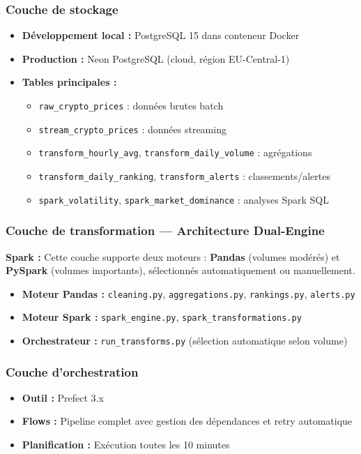 \documentclass[12pt,a4paper]{article}
\newcommand{\sparkbox}[1]{%
  \vspace{4pt}
  \noindent\colorbox{orange!15}{\parbox{\dimexpr\linewidth-2\fboxsep}{%
    {\color{sparkcolor}\textbf{Spark :}} #1
  }}
  \vspace{4pt}
}
\begin{document}
\subsubsection{Couche de stockage}
\begin{itemize}
    \item \textbf{Développement local :} PostgreSQL 15 dans conteneur Docker
    \item \textbf{Production :} Neon PostgreSQL (cloud, région EU-Central-1)
    \item \textbf{Tables principales :}
    \begin{itemize}[noitemsep]
        \item \texttt{raw\_crypto\_prices} : données brutes batch
        \item \texttt{stream\_crypto\_prices} : données streaming
        \item \texttt{transform\_hourly\_avg}, \texttt{transform\_daily\_volume} : agrégations
        \item \texttt{transform\_daily\_ranking}, \texttt{transform\_alerts} : classements/alertes
        \item \texttt{spark\_volatility}, \texttt{spark\_market\_dominance} : analyses Spark SQL
    \end{itemize}
\end{itemize}

\subsubsection{Couche de transformation --- Architecture Dual-Engine}

\sparkbox{Cette couche supporte deux moteurs : \textbf{Pandas} (volumes modérés) et \textbf{PySpark} (volumes importants), sélectionnés automatiquement ou manuellement.}

\begin{itemize}
    \item \textbf{Moteur Pandas :} \texttt{cleaning.py}, \texttt{aggregations.py}, \texttt{rankings.py}, \texttt{alerts.py}
    \item \textbf{Moteur Spark :} \texttt{spark\_engine.py}, \texttt{spark\_transformations.py}
    \item \textbf{Orchestrateur :} \texttt{run\_transforms.py} (sélection automatique selon volume)
\end{itemize}

\subsubsection{Couche d'orchestration}
\begin{itemize}
    \item \textbf{Outil :} Prefect 3.x
    \item \textbf{Flows :} Pipeline complet avec gestion des dépendances et retry automatique
    \item \textbf{Planification :} Exécution toutes les 10 minutes
\end{itemize}
\end{document}
